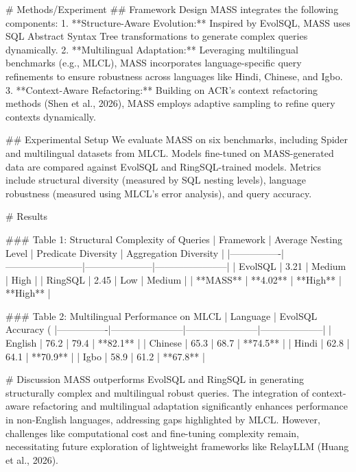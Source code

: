 # Methods/Experiment  
## Framework Design  
MASS integrates the following components:  
1. **Structure-Aware Evolution:** Inspired by EvolSQL, MASS uses SQL Abstract Syntax Tree transformations to generate complex queries dynamically.  
2. **Multilingual Adaptation:** Leveraging multilingual benchmarks (e.g., MLCL), MASS incorporates language-specific query refinements to ensure robustness across languages like Hindi, Chinese, and Igbo.  
3. **Context-Aware Refactoring:** Building on ACR's context refactoring methods (Shen et al., 2026), MASS employs adaptive sampling to refine query contexts dynamically.

## Experimental Setup  
We evaluate MASS on six benchmarks, including Spider and multilingual datasets from MLCL. Models fine-tuned on MASS-generated data are compared against EvolSQL and RingSQL-trained models. Metrics include structural diversity (measured by SQL nesting levels), language robustness (measured using MLCL's error analysis), and query accuracy.

# Results  

### Table 1: Structural Complexity of Queries  
| Framework      | Average Nesting Level | Predicate Diversity | Aggregation Diversity |  
|----------------|------------------------|---------------------|-----------------------|  
| EvolSQL        | 3.21                  | Medium              | High                  |  
| RingSQL        | 2.45                  | Low                 | Medium                |  
| **MASS**       | **4.02**              | **High**            | **High**              |  

### Table 2: Multilingual Performance on MLCL  
| Language       | EvolSQL Accuracy (%
|----------------|-----------------------|-----------------------|--------------------|  
| English        | 76.2                 | 79.4                 | **82.1**           |  
| Chinese        | 65.3                 | 68.7                 | **74.5**           |  
| Hindi          | 62.8                 | 64.1                 | **70.9**           |  
| Igbo           | 58.9                 | 61.2                 | **67.8**           |  

# Discussion  
MASS outperforms EvolSQL and RingSQL in generating structurally complex and multilingual robust queries. The integration of context-aware refactoring and multilingual adaptation significantly enhances performance in non-English languages, addressing gaps highlighted by MLCL. However, challenges like computational cost and fine-tuning complexity remain, necessitating future exploration of lightweight frameworks like RelayLLM (Huang et al., 2026).

